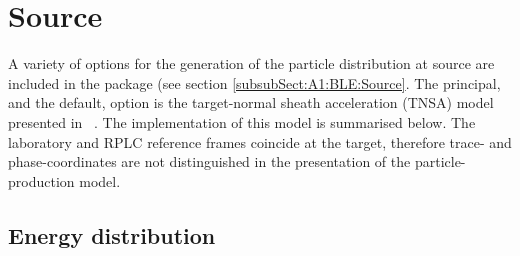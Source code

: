 \graphicspath{ {05-Source/Figures/} }

\section{Source}

A variety of options for the generation of the particle distribution
at source are included in the package (see
section \ref{subsubSect:A1:BLE:Source}.
The principal, and the default, option is the target-normal sheath
acceleration (TNSA) model presented in~\cite{10.1038/nphys199} .
The implementation of this model is summarised below.
The laboratory and RPLC reference frames coincide at the target,
therefore trace- and phase-coordinates are not distinguished in the
presentation of the particle-production model.

\subsection{Energy distribution}


